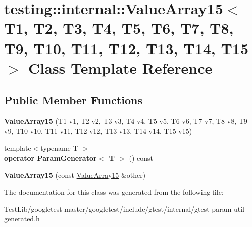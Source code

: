 \hypertarget{classtesting_1_1internal_1_1ValueArray15}{}\section{testing\+:\+:internal\+:\+:Value\+Array15$<$ T1, T2, T3, T4, T5, T6, T7, T8, T9, T10, T11, T12, T13, T14, T15 $>$ Class Template Reference}
\label{classtesting_1_1internal_1_1ValueArray15}
\subsection*{Public Member Functions}
\begin{DoxyCompactItemize}
\item 
\mbox{\label{classtesting_1_1internal_1_1ValueArray15_a2f9c6670b744cb08587bea1b50e169b4}} 
{\bfseries Value\+Array15} (T1 v1, T2 v2, T3 v3, T4 v4, T5 v5, T6 v6, T7 v7, T8 v8, T9 v9, T10 v10, T11 v11, T12 v12, T13 v13, T14 v14, T15 v15)
\item 
\mbox{\label{classtesting_1_1internal_1_1ValueArray15_ab5a77c335c83ef3f99e3133c2213c495}} 
{\footnotesize template$<$typename T $>$ }\\{\bfseries operator Param\+Generator$<$ T $>$} () const
\item 
\mbox{\label{classtesting_1_1internal_1_1ValueArray15_ab08ee6de70a42bc580229cc32635fa5c}} 
{\bfseries Value\+Array15} (const \hyperlink{classtesting_1_1internal_1_1ValueArray15}{Value\+Array15} \&other)
\end{DoxyCompactItemize}


The documentation for this class was generated from the following file\+:\begin{DoxyCompactItemize}
\item 
Test\+Lib/googletest-\/master/googletest/include/gtest/internal/gtest-\/param-\/util-\/generated.\+h\end{DoxyCompactItemize}
